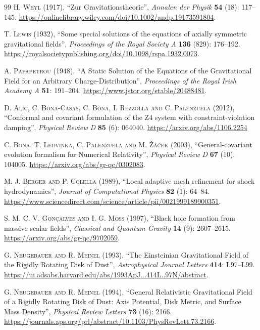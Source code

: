 \documentclass{article}
\begin{document}
\begin{thebibliography}{99}
\textsc{H. Weyl} (1917), ``Zur Gravitationstheorie'', \textit{Annalen der Physik} \textbf{54} (18): 117--145. \url{https://onlinelibrary.wiley.com/doi/10.1002/andp.19173591804}.

\textsc{T. Lewis} (1932), ``Some special solutions of the equations of axially symmetric gravitational fields'', \textit{Proceedings of the Royal Society A} \textbf{136} (829): 176--192. \url{https://royalsocietypublishing.org/doi/10.1098/rspa.1932.0073}.

\textsc{A. Papapetrou} (1948), ``A Static Solution of the Equations of the Gravitational Field for an Arbitrary Charge-Distribution'', \textit{Proceedings of the Royal Irish Academy A} \textbf{51}: 191--204. \url{https://www.jstor.org/stable/20488481}.

\textsc{D. Alic, C. Bona-Casas, C. Bona, L Rezzolla and C. Palenzuela} (2012), ``Conformal and covariant formulation of the Z4 system with constraint-violation damping'', \textit{Physical Review D} \textbf{85} (6): 064040. \url{https://arxiv.org/abs/1106.2254}

\textsc{C. Bona, T. Ledvinka, C. Palenzuela and M. \v{Z}\'a\v{c}ek} (2003), ``General-covariant evolution formalism for Numerical Relativity'', \textit{Physical Review D} \textbf{67} (10): 104005. \url{https://arxiv.org/abs/gr-qc/0302083}.

\textsc{M. J. Berger and P. Colella} (1989), ``Local adaptive mesh refinement for shock hydrodynamics'', \textit{Journal of Computational Physics} \textbf{82} (1): 64--84. \url{https://www.sciencedirect.com/science/article/pii/0021999189900351}.

\textsc{S. M. C. V. Gon\c{c}alves and I. G. Moss} (1997), ``Black hole formation from massive scalar fields'', \textit{Classical and Quantum Gravity} \textbf{14} (9): 2607--2615. \url{https://arxiv.org/abs/gr-qc/9702059}.

\textsc{G. Neugebauer and R. Meinel} (1993), ``The Einsteinian Gravitational Field of the Rigidly Rotating Disk of Dust'', \textit{Astrophysical Journal Letters} \textbf{414}: L97--L99. \url{https://ui.adsabs.harvard.edu/abs/1993ApJ...414L..97N/abstract}.

\textsc{G. Neugebauer and R. Meinel} (1994), ``General Relativistic Gravitational Field of a Rigidly Rotating Disk of Dust: Axis Potential, Disk Metric, and Surface Mass Density'', \textit{Physical Review Letters} \textbf{73} (16): 2166. \url{https://journals.aps.org/prl/abstract/10.1103/PhysRevLett.73.2166}.


\end{thebibliography}
\end{document}
